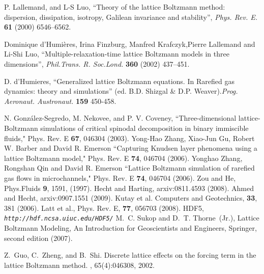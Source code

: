 \documentclass[a4paper]{article}
\begin{document}
\begin{thebibliography}{32}
 P. Lallemand, and L-S Luo, ``Theory of the lattice Boltzmann
method: dispersion, dissipation, isotropy, Galilean invariance and stability'',
\textsl{Phys. Rev. E.} \textbf{61} (2000) 6546--6562.

 Dominique d'Humières, Irina Finzburg, Manfred
  Krafczyk,Pierre Lallemand and Li-Shi Luo, ``Multiple-relaxation-time lattice 
  Boltzmann models in three dimensions'', \textsl{Phil.Trans. R. Soc.Lond.}
  \textbf{360} (2002) 437--451. 

 D. d'Humieres, ``Generalized lattice Boltzmann equations. In
Rarefied gas dynamics: theory and simulations'' (ed. B.D. Shizgal \& D.P. Weaver).\textsl{Prog. Aeronaut. Austronaut.} \textbf{159} 450-458.

 N. Gonz\'alez-Segredo, M. Nekovee, and P. V. Coveney,
``Three-dimensional lattice-Boltzmann simulations of critical spinodal
decomposition in binary immiscible fluids," Phys. Rev. E {\bf 67},
046304 (2003).
 Yong-Hao Zhang, Xiao-Jun Gu, Robert W. Barber and David R. Emerson
``Capturing Knudsen layer phenomena using a lattice Boltzmann model," Phys. Rev. E {\bf 74}, 046704 (2006).
 Yonghao Zhang, Rongshan Qin and David R. Emerson
``Lattice Boltzmann simulation of rarefied gas flows in microchannels," Phys. Rev. E {\bf 74}, 046704 (2006).
 Zou and He, Phys.Fluids {\bf 9}, 1591, (1997).
 Hecht and Harting, arxiv:0811.4593 (2008).
 Ahmed and Hecht, arxiv:0907.1551 (2009).
 Kutay et al. Computers and Geotechnics, {\bf 33}, 381 (2006).
 Latt et al., Phys. Rev. E, {\bf 77}, 056703 (2008).
	HDF5,
	{\it {\tt http://hdf.ncsa.uiuc.edu/HDF5/} }
 M.~C. Sukop and D.~T. {Thorne~(Jr.)}, 
Lattice Boltzmann Modeling, An Introduction for Geoscientists and
                  Engineers, Springer, second edition (2007).

Z.~Guo, C.~Zheng, and B.~Shi.
\newblock Discrete lattice effects on the forcing term in the lattice
  {B}oltzmann method.
, 65(4):046308, 2002.
\end{thebibliography}
\end{document}
